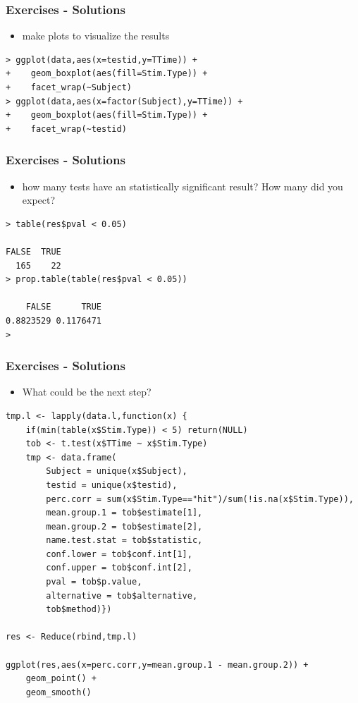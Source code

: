 \documentclass[xcolor={table}]{beamer}
\begin{document}
\begin{frame}[fragile]\frametitle{Exercises - Solutions}
  \begin{itemize}
  \item make plots to visualize the results
  \end{itemize}\footnotesize
\begin{verbatim}
> ggplot(data,aes(x=testid,y=TTime)) +
+    geom_boxplot(aes(fill=Stim.Type)) +
+    facet_wrap(~Subject)
> ggplot(data,aes(x=factor(Subject),y=TTime)) +
+    geom_boxplot(aes(fill=Stim.Type)) +
+    facet_wrap(~testid)
\end{verbatim}
\end{frame}


\begin{frame}[fragile]\frametitle{Exercises - Solutions}
  \begin{itemize}
  \item how many tests have an statistically significant result? How many did you expect? 
  \end{itemize}\footnotesize
\begin{verbatim}
> table(res$pval < 0.05)

FALSE  TRUE 
  165    22 
> prop.table(table(res$pval < 0.05))

    FALSE      TRUE 
0.8823529 0.1176471 
> 
\end{verbatim}
\end{frame}


\begin{frame}\frametitle{Exercises - Solutions}
  \begin{itemize}
  \item  What could be the next step?
  \end{itemize}\tiny
\begin{verbatim}
tmp.l <- lapply(data.l,function(x) {
    if(min(table(x$Stim.Type)) < 5) return(NULL)
    tob <- t.test(x$TTime ~ x$Stim.Type)
    tmp <- data.frame(
        Subject = unique(x$Subject),
        testid = unique(x$testid),
        perc.corr = sum(x$Stim.Type=="hit")/sum(!is.na(x$Stim.Type)),
        mean.group.1 = tob$estimate[1],
        mean.group.2 = tob$estimate[2],
        name.test.stat = tob$statistic,
        conf.lower = tob$conf.int[1],
        conf.upper = tob$conf.int[2],
        pval = tob$p.value,
        alternative = tob$alternative,
        tob$method)})

res <- Reduce(rbind,tmp.l)

ggplot(res,aes(x=perc.corr,y=mean.group.1 - mean.group.2)) +
    geom_point() +
    geom_smooth()
\end{verbatim}
\end{frame}
\end{document}
